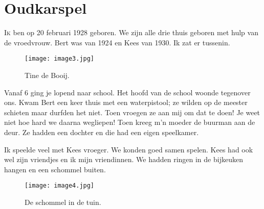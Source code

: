 

\chapter*{Oudkarspel}

\lettrine[lines=2, loversize=0.3, lraise=0]{\initfamily I}{k} ben op 20 februari 1928 geboren. We
zijn alle drie thuis geboren met hulp van de vroedvrouw. Bert was van 1924 en Kees van 1930. Ik zat
er tussenin.

\begin{figure}[h] \texttt{[image: image3.jpg]} \caption{Tine de Booij.}
\end{figure}

Vanaf 6 ging je lopend naar school. Het hoofd van de school woonde tegenover ons. Kwam Bert een keer
thuis met een waterpistool; ze wilden op de meester schieten maar durfden het niet. Toen vroegen ze
aan mij om dat te doen! Je weet niet hoe hard we daarna wegliepen! Toen kreeg m’n moeder de
buurman aan de deur. Ze hadden een dochter en die had een eigen speelkamer.

Ik speelde veel met Kees vroeger. We konden goed samen spelen. Kees had ook wel zijn vriendjes en ik
mijn vriendinnen. We hadden ringen in de bijkeuken hangen en een schommel buiten.

\begin{figure}[h] \texttt{[image: image4.jpg]} \caption{De schommel in de tuin.}
\end{figure}

